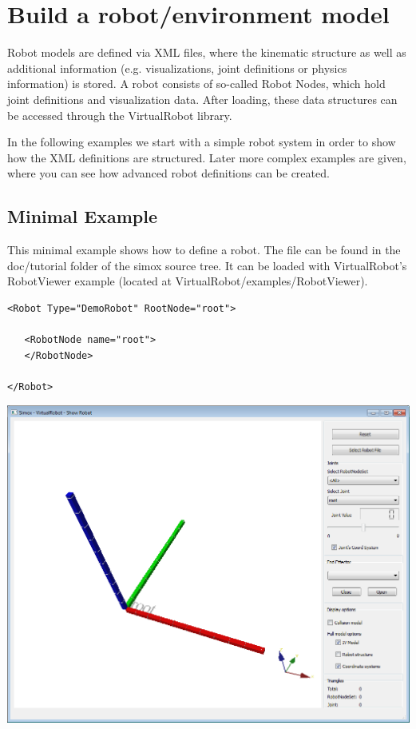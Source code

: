 \documentclass{book}
\begin{document}
\section{Build a robot/environment model}
Robot models are defined via XML files, where the kinematic structure as well as additional information (e.g. visualizations, joint definitions or physics information) is stored. A robot consists of so-called Robot Nodes, which hold joint definitions and visualization data. After loading, these data structures can be accessed through the VirtualRobot library.\par In the following examples we start with a simple robot system in order to show how the XML definitions are structured. Later more complex examples are given, where you can see how advanced robot definitions can be created. \par

\subsection{Minimal Example}
\par
This minimal example shows how to define a robot. The file can be found in the doc/tutorial folder of the simox source tree. It can be loaded with VirtualRobot's RobotViewer example (located at VirtualRobot/examples/RobotViewer). 
\par
\begin{lstlisting}
<Robot Type="DemoRobot" RootNode="root">

   <RobotNode name="root">
   </RobotNode>

</Robot>
\end{lstlisting}
\includegraphics[width=\textwidth]{Tutorial1}
\par
\end{document}
